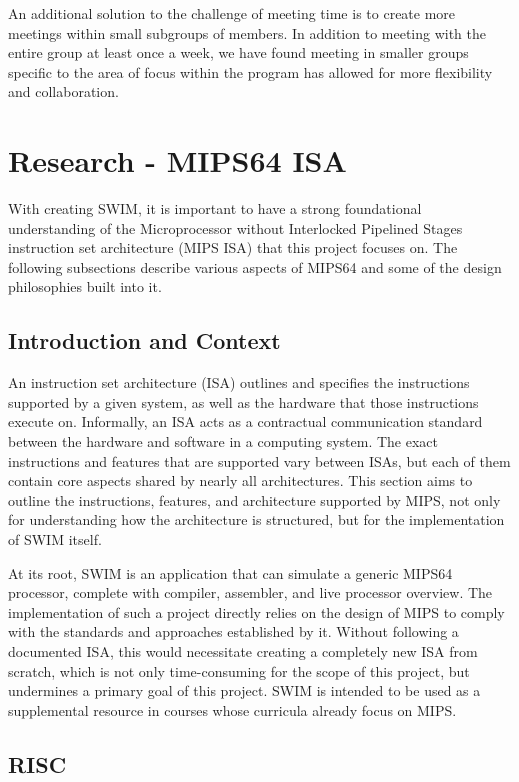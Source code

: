 \documentclass[
    paper=letter,
    parskip=half,
    fontsize=12pt,
    titlepage=firstiscover,
    toc=bibliography,
    numbers=endperiod
]{scrartcl}
\let\oldsection\section
\renewcommand{\section}{\newpage\oldsection}
\begin{document}
An additional solution to the challenge of meeting time is to create more meetings within small subgroups of members. In addition to meeting with the entire group at least once a week, we have found meeting in smaller groups specific to the area of focus within the program has allowed for more flexibility and collaboration.


\section{Research - MIPS64 ISA}

With creating SWIM, it is important to have a strong foundational
understanding of the Microprocessor without Interlocked Pipelined Stages
instruction set architecture (MIPS ISA) that this project focuses on.
The following subsections describe various aspects of MIPS64 and some of
the design philosophies built into it.

\subsection{Introduction and Context}

An instruction set architecture (ISA) outlines and specifies the
instructions supported by a given system, as well as the hardware that
those instructions execute on. Informally, an ISA acts as a contractual
communication standard between the hardware and software in a computing
system. The exact instructions and features that are supported vary
between ISAs, but each of them contain core aspects shared by nearly all
architectures. This section aims to outline the instructions, features,
and architecture supported by MIPS, not only for understanding how the
architecture is structured, but for the implementation of SWIM itself.

At its root, SWIM is an application that can simulate a generic MIPS64
processor, complete with compiler, assembler, and live processor
overview. The implementation of such a project directly relies on the
design of MIPS to comply with the standards and approaches established
by it. Without following a documented ISA, this would necessitate
creating a completely new ISA from scratch, which is not only
time-consuming for the scope of this project, but undermines a primary
goal of this project. SWIM is intended to be used as a supplemental
resource in courses whose curricula already focus on MIPS.

\subsection{RISC}
\end{document}
